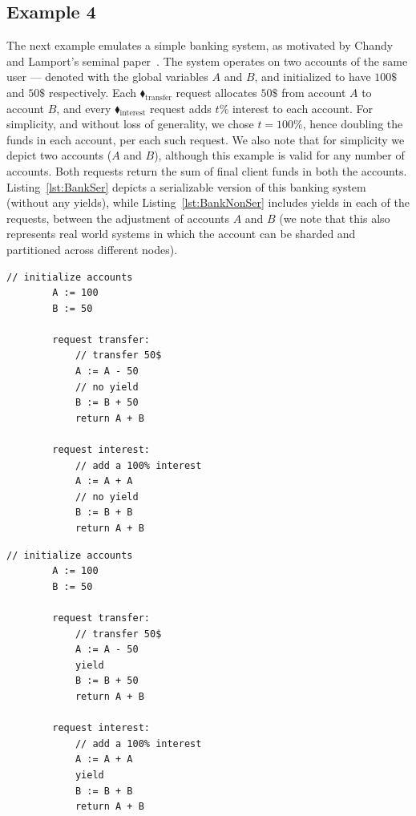 	
	
\subsection{Example 4}

The next example emulates a simple banking system, as motivated by Chandy and Lamport's seminal paper~\cite{ChLa85}. The system operates on two accounts of the same user --- denoted with the global variables $A$ and $B$, and initialized to have $100\$$ and $50\$$ respectively. 
%
Each {\color{ForestGreen}$\blacklozenge_\text{transfer}$} request allocates $50\$$ from account $A$ to account $B$, and every {\color{ForestGreen}$\blacklozenge_\text{interest}$} request adds $t\%$ interest to each account. For simplicity, and without loss of generality, we chose $t=100\%$, hence doubling the funds in each account, per each such request. We also note that for simplicity we depict two accounts ($A$ and $B$), although this example is valid for any number of accounts.
%
Both requests return the sum of final client funds in both the accounts.  
%
Listing~\ref{lst:BankSer} depicts a serializable version of this banking system (without any yields), while Listing~\ref{lst:BankNonSer} includes yields in each of the requests, between the adjustment of accounts $A$ and $B$ (we note that this also represents real world systems in which the account can be sharded and partitioned across different nodes).
%


\noindent
\begin{minipage}[t]{0.45\textwidth}
	\begin{lstlisting}[caption={bank (serializable)},
		label={lst:BankSer}]
	    // initialize accounts
	    A := 100
	    B := 50
	    
	    request transfer: 
	        // transfer 50$
	        A := A - 50
	        // no yield
	        B := B + 50
	        return A + B
				
	    request interest: 
	        // add a 100% interest
	        A := A + A
	        // no yield
	        B := B + B
	        return A + B	      		        
			\end{lstlisting}
\end{minipage}
\hfill
\begin{minipage}[t]{0.45\textwidth}
	\begin{lstlisting}[caption={bank with yields (non serializable)},
		label={lst:BankNonSer}]
	    // initialize accounts
	    A := 100
	    B := 50
			
	    request transfer: 
	        // transfer 50$
	        A := A - 50
	        yield
	        B := B + 50
	        return A + B
	
	    request interest: 
	        // add a 100% interest
	        A := A + A
	        yield
	        B := B + B
	        return A + B	      		        
		\end{lstlisting}
\end{minipage}
	

